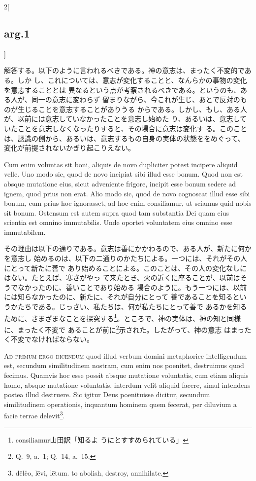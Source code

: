 \documentclass[paper=a4paper,fontsize=10pt,jafontsize=9pt,titlepage]{jlreq}
\begin{document}
\begin{paracol}{2}[\subsection{arg.1}]
\switchcolumn

解答する。以下のように言われるべきである。神の意志は、まったく不変的である。しか
し、これについては、意志が変化することと、なんらかの事物の変化を意志することとは
異なるという点が考察されるべきである。というのも、ある人が、同一の意志に変わらず
留まりながら、今これが生じ、あとで反対のものが生じることを意志することがありうる
からである。しかし、もし、ある人が、以前には意志していなかったことを意志し始めた
り、あるいは、意志していたことを意志しなくなったりすると、その場合に意志は変化す
る。このことは、認識の側から、あるいは、意志するもの自身の実体の状態ををめぐって、
変化が前提されないかぎり起こりえない。

\switchcolumn*


Cum enim voluntas sit boni, aliquis de novo dupliciter potest incipere aliquid
 velle. Uno modo sic, quod de novo incipiat sibi illud esse bonum. Quod non est
 absque mutatione eius, sicut adveniente frigore, incipit esse bonum sedere ad
 ignem, quod prius non erat. Alio modo sic, quod de novo cognoscat illud esse
 sibi bonum, cum prius hoc ignorasset, ad hoc enim consiliamur, ut sciamus quid
 nobis sit bonum. Ostensum est autem supra quod tam substantia Dei quam eius
 scientia est omnino immutabilis. Unde oportet voluntatem eius omnino esse
 immutabilem.

\switchcolumn

その理由は以下の通りである。意志は善にかかわるので、ある人が、新たに何かを意志し
始めるのは、以下の二通りのかたちによる。一つには、それがその人にとって新たに善で
あり始めることによる。このことは、その人の変化なしにはない。たとえば、寒さがやっ
て来たとき、火の近くに座ることが、以前はそうでなかったのに、善いことであり始める
場合のように。もう一つには、以前には知らなかったのに、新たに、それが自分にとって
善であることを知るというかたちである。じっさい、私たちは、何が私たちにとって善で
あるかを知るために、さまざまなことを探究する\footnote{consiliamur山田訳「知るよ
うにとすすめられている」}。ところで、神の実体は、神の知と同様に、まったく不変で
あることが前に\footnote{Q.~9, a.~1; Q.~14, a.~15.}示された。したがって、神の意志
はまったく不変でなければならない。

\switchcolumn*[\subsection{ad.1}]


{\scshape Ad primum ergo dicendum} quod illud verbum domini metaphorice
 intelligendum est, secundum similitudinem nostram, cum enim nos poenitet,
 destruimus quod fecimus. Quamvis hoc esse possit absque mutatione voluntatis,
 cum etiam aliquis homo, absque mutatione voluntatis, interdum velit aliquid
 facere, simul intendens postea illud destruere. Sic igitur Deus poenituisse
 dicitur, secundum similitudinem operationis, inquantum hominem quem fecerat,
 per diluvium a facie terrae delevit\footnote{d\={e}l\u{e}o, l\={e}vi,
 l\={e}tum. to abolish, destroy, annihilate.}.


\end{paracol}
\end{document}
